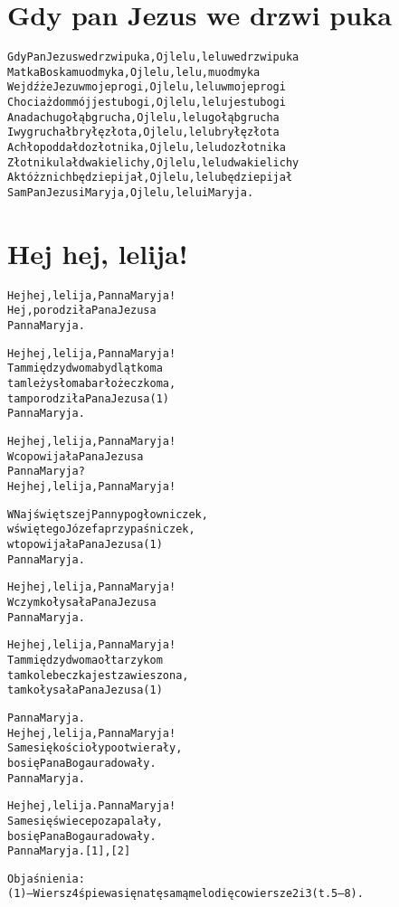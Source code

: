 \documentclass[a4paper,12pt]{article}
\begin{document}
\section*{Gdy pan Jezus we drzwi puka}
\begin{alltt}
Gdy Pan Jezus we drzwi puka, Oj lelu, lelu we drzwi puka
Matka Boska mu odmyka, Oj lelu, lelu, mu odmyka
Wejdźże Jezu w moje progi, Oj lelu, lelu w moje progi
Chociaż dom mój jest ubogi, Oj lelu, lelu jest ubogi
A na dachu gołąb grucha, Oj lelu, lelu gołąb grucha
I wygruchał bryłę złota, Oj lelu, lelu bryłę złota
Achłop oddał do złotnika, Oj lelu, lelu do złotnika
Złotnik ulał dwa kielichy, Oj lelu, lelu dwa kielichy
A któż z nich będzie pijał, Oj lelu, lelu będzie pijał
Sam Pan Jezus i Maryja, Oj lelu, lelu i Maryja.
\end{alltt}


\section*{Hej hej, lelija!}
\begin{alltt}
Hej hej, lelija, Panna Maryja!
Hej, porodziła Pana Jezusa
Panna Maryja.

Hej hej, lelija, Panna Maryja!
Tam między dwoma bydlątkoma
tam leży słoma barłożeczkoma,
tam porodziła Pana Jezusa(1)
Panna Maryja.

Hej hej, lelija, Panna Maryja!
W co powijała Pana Jezusa
Panna Maryja?
Hej hej, lelija, Panna Maryja!

W Najświętszej Panny pogłowniczek,
w świętego Józefa przypaśniczek,
w to powijała Pana Jezusa(1)
Panna Maryja.

Hej hej, lelija, Panna Maryja!
W czym kołysała Pana Jezusa
Panna Maryja.

Hej hej, lelija, Panna Maryja!
Tam między dwoma ołtarzykom
tam kolebeczka jest zawieszona,
tam kołysała Pana Jezusa(1)

Panna Maryja.
Hej hej, lelija, Panna Maryja!
Same się kościoły pootwierały,
bo się Pana Boga uradowały.
Panna Maryja.

Hej hej, lelija. Panna Maryja!
Same się świece pozapalały,
bo się Pana Boga uradowały.
Panna Maryja. [1], [2]

Objaśnienia:
(1) – Wiersz 4 śpiewa się na tę samą melodię co wiersze 2 i 3 (t. 5–8).
\end{alltt}
\end{document}
